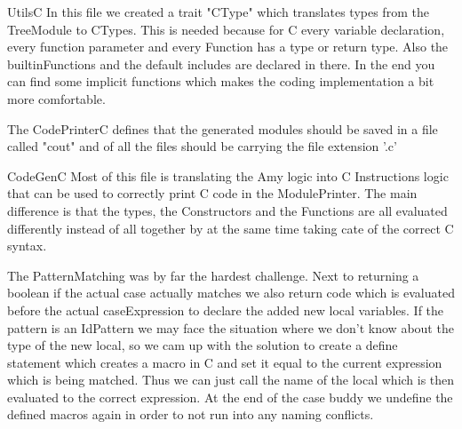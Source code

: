 UtilsC
In this file we created a trait "CType" which translates types from the TreeModule to CTypes. This is needed because for
C every variable declaration, every function parameter and every Function has a type or return type.
Also the builtinFunctions and the default includes are declared in there. In the end you can find some implicit functions
which makes the coding implementation a bit more comfortable.

The CodePrinterC defines that the generated modules should be saved in a file called "cout" and of all the files
should be carrying the file extension '.c'

CodeGenC
Most of this file is translating the Amy logic into C Instructions logic that can be used to correctly print C code in the
ModulePrinter. The main difference is that the types, the Constructors and the Functions are all evaluated differently
instead of all together by at the same time taking cate of the correct C syntax.

The PatternMatching was by far the hardest challenge. Next to returning a boolean if the actual case actually matches
we also return code which is evaluated before the actual caseExpression to declare the added new local variables.
If the pattern is an IdPattern we may face the situation where we don't know about the type of the new local,
so we cam up with the solution to create a define statement which creates a macro in C and set it equal to the current
expression which is being matched. Thus we can just call the name of the local which is then evaluated
to the correct expression. At the end of the case buddy we undefine the defined macros again in order to not run into any
naming conflicts.
